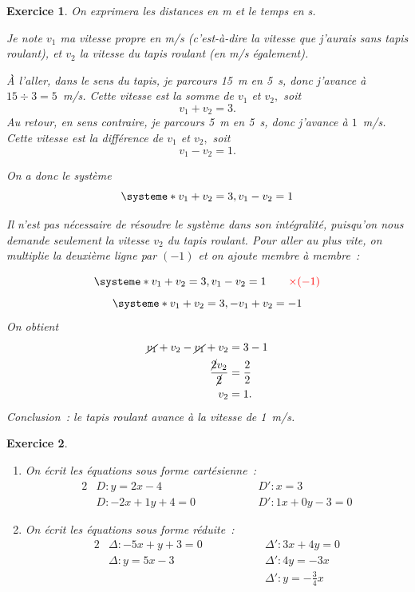 \documentclass[10pt]{article}
\newtheorem{exo}{Exercice}
\begin{document}
\begin{exo}

On exprimera les distances en m et le temps en s.%

\medskip

Je note $v_1$ ma vitesse propre en m/s (c'est-à-dire la vitesse que j'aurais sans tapis roulant), et $v_2$ la vitesse du tapis roulant (en m/s également).

\medskip

À l'aller, dans le sens du tapis, je parcours 15~m en 5~s, donc j'avance à $15\div 3=5$~m/s.
Cette vitesse est la somme de $v_1$ et $v_2,$ soit
\[v_1+v_2=3.\]
Au retour, en sens contraire, je parcours 5~m en 5~s, donc j'avance à $1$~m/s.
Cette vitesse est la différence de $v_1$ et $v_2,$ soit
\[v_1-v_2=1.\]

On a donc le système
\[
\systeme*{v_1+v_2=3,v_1-v_2=1}
\]

Il n'est pas nécessaire de résoudre le système dans son intégralité, puisqu'on nous demande seulement la vitesse $v_2$ du tapis roulant. Pour aller au plus vite, on multiplie la deuxième ligne par $(-1)$ et on ajoute membre à membre~:

\[
\systeme*{v_1+v_2=3,v_1-v_2=1\textcolor{red}{\qquad\times (-1)}}
\]
\[
\systeme*{v_1+v_2=3,-v_1+v_2=-1}
\]
On obtient \begin{align*}
\cancel{v_1}+v_2-\cancel{v_1}+v_2&=3-1\\
\frac{\cancel{2}v_2}{\cancel{2}}&=\frac{2}{2}\\
v_2&=1.\end{align*}
Conclusion~: le tapis roulant avance à la vitesse de 1~m/s.


\end{exo}

\begin{exo}


\begin{enumerate}
\item On écrit les équations sous forme cartésienne~:
\begin{alignat*}{2}
&D:y=2x-4\qquad \qquad &&D':x=3\\
&D:-2x+1y+4=0\qquad\qquad &&D':1x+0y-3=0\end{alignat*}
\item On écrit les équations sous forme réduite~:
\begin{alignat*}{2}
&\Delta:-5x+y+3=0\qquad\qquad &&\Delta':3x+4y=0\\
&\Delta:y=5x-3\qquad\qquad &&\Delta':4y=-3x\\
& &&\Delta':y=-\frac{3}{4}x
\end{alignat*}

\end{enumerate}

\end{exo}
\end{document}

